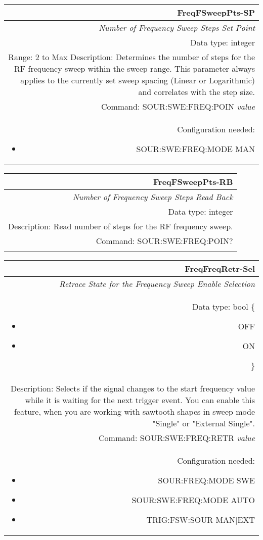\documentclass[openany]{article}
\begin{document}
		\begin{tabular}{N}
			\hline
			\bfseries FreqFSweepPts-SP \\ \hline
			\emph{Number of Frequency Sweep Steps Set Point} \\
			Data type: integer \\
			Range: 2 to Max
			Description: Determines the number of steps for the RF frequency sweep within the sweep range. This parameter always applies to the currently set sweep spacing (Linear or Logarithmic) and correlates with the step size. \\
			Command: SOUR:SWE:FREQ:POIN \emph{value} \\
			Configuration needed: \begin{itemize}[noitemsep]
				\small
				\item[] SOUR:SWE:FREQ:MODE MAN
			\end{itemize} \\
		
		\end{tabular}


		\begin{tabular}{N}
			\hline
			\bfseries FreqFSweepPts-RB \\ \hline
			\emph{Number of Frequency Sweep Steps Read Back} \\
			Data type: integer \\
			Description: Read number of steps for the RF frequency sweep. \\
			Command: SOUR:SWE:FREQ:POIN? \\
			\\

		\end{tabular}


		\begin{tabular}{N}
			\hline
			\bfseries FreqFreqRetr-Sel \\ \hline
			\emph{Retrace State for the Frequency Sweep Enable Selection} \\
			Data type: bool \{\begin{itemize}[noitemsep]
				\small
				\item[] OFF
				\item[] ON
			\end{itemize}\} \\
			Description: Selects if the signal changes to the start frequency value while it is waiting for the next trigger event. You can enable this feature, when you are working with sawtooth shapes in sweep mode "Single" or "External Single". \\
			Command: SOUR:SWE:FREQ:RETR \emph{value} \\
			Configuration needed: \begin{itemize}[noitemsep]
				\small
				\item[] SOUR:FREQ:MODE SWE
				\item[] SOUR:SWE:FREQ:MODE AUTO
				\item[] TRIG:FSW:SOUR MAN|EXT
			\end{itemize} \\

		\end{tabular}
\end{document}

